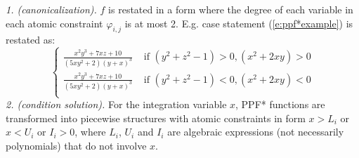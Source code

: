 \documentclass[]{article}
\newcommand{\case}[2]{#2 &\text{ if } #1}%
\newcommand{\otherwise}[1]{#1 &\text{ otherwise}}
\newcommand{\dd}{\;\mathrm{d}} %
\begin{document}
\emph{1. (canonicalization).} $f$ is restated in a form where
the degree of each variable in each atomic constraint $\varphi_{i,j}$ is at most 2.
E.g. case statement (\ref{e:ppf*example}) is restated as:
\begin{equation}
\begin{cases}
\case{(y^2+z^2 -1)>0, (x^2+2xy)>0}{\frac{x^2 y^3 + 7xz + 10}{(5xy^2 + 2)(y + x)^3}}\\
\case{(y^2+z^2 -1)<0, (x^2+2xy)<0}{\frac{x^2 y^3 + 7xz + 10}{(5xy^2 + 2)(y + x)^3}}\\
\end{cases}
\end{equation}
\emph{2. (condition solution).} For the integration variable $x$, PPF* functions are transformed into piecewise structures 
with atomic constraints in form $x>L_i$ or $x<U_i$ or $I_i>0$, 
where $L_i$, $U_i$ and $I_i$ are 
algebraic expressions (not necessarily polynomials) that do not involve $x$. 
\end{document}
